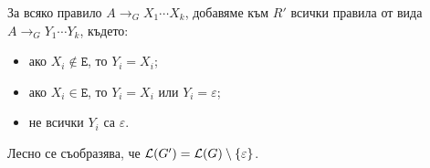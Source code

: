 \begin{hint}
\begin{enumerate}[1)]
    За всяко правило $A \to_G X_1\cdots X_k$,
    добавяме към $R'$ всички правила от вида $A \to_G Y_1\cdots Y_k$, където:
    \begin{itemize}[-]
    \item 
      ако $X_i \not\in \texttt{E}$, то $Y_i = X_i$;
    \item
      ако $X_i \in \texttt{E}$, то $Y_i = X_i$ или $Y_i = \varepsilon$;
    \item
      не всички $Y_i$ са $\varepsilon$.
    \end{itemize}
    Лесно се съобразява, че $\mathcal{L}(G') = \mathcal{L}(G) \setminus \{\varepsilon\}$.
  \end{enumerate}
\end{hint}

